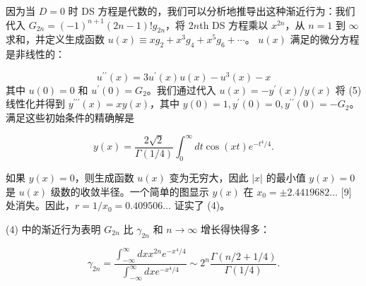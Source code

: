 \documentclass[UTF8]{article}
\begin{document}
因为当 \( D=0 \) 时 DS 方程是代数的，我们可以分析地推导出这种渐近行为：我们代入 \( G_{2 n}=(-1)^{n+1}(2 n-1) ! g_{2 n} \)，将 \( 2 n \)th DS 方程乘以 \( x^{2 n} \)，从 \( n=1 \) 到 \( \infty \) 求和，并定义生成函数 \( u(x) \equiv x g_{2}+x^{3} g_{4}+x^{5} g_{6}+\cdots \)。 \( u(x) \) 满足的微分方程是非线性的：




\[u^{\prime \prime}(x)=3 u^{\prime}(x) u(x)-u^{3}(x)-x
\] 其中 \( u(0)=0 \) 和 \( u^{\prime}(0)=G_{2} \)。我们通过代入 \( u(x)=-y^{\prime}(x) / y(x) \) 将 (5) 线性化并得到 \( y^{\prime \prime \prime}(x)=x y(x) \)，其中 \( y(0)=1, y^{\prime}(0)=0, y^{\prime \prime}(0)=-G_{2} \)。满足这些初始条件的精确解是




\[y(x)=\frac{2 \sqrt{2}}{\Gamma(1 / 4)} \int_{0}^{\infty} d t \cos (x t) e^{-t^{4} / 4} .
\]


如果 \( y(x)=0 \)，则生成函数 \( u(x) \) 变为无穷大，因此 \( |x| \) 的最小值 \( y(x)=0 \) 是 \( u(x) \) 级数的收敛半径。一个简单的图显示 \( y(x) \) 在 \( x_{0}= \pm 2.4419682 \ldots \) [9] 处消失。因此，\( r=1 / x_{0}=0.409506 \ldots \) 证实了 (4)。



(4) 中的渐近行为表明 \( G_{2 n} \) 比 \( \gamma_{2 n} \) 和 \( n \rightarrow \infty \) 增长得快得多：


\[
\gamma_{2 n}=\frac{\int_{-\infty}^{\infty} d x x^{2 n} e^{-x^{4} / 4}}{\int_{-\infty}^{\infty} d x e^{-x^{4} / 4}} \sim 2^{n} \frac{\Gamma(n / 2+1 / 4)}{\Gamma(1 / 4)} .
\]
\end{document}
